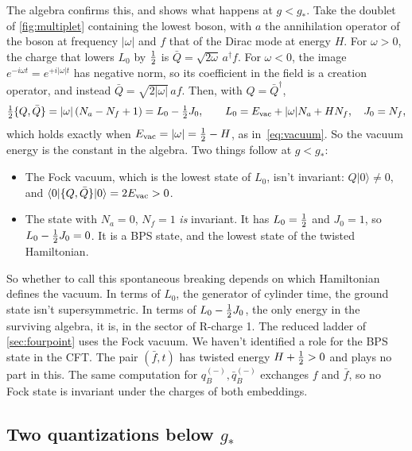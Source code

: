 The algebra confirms this, and shows what happens at $g<g_*$. Take the doublet of \cref{fig:multiplet} containing the lowest boson, with $a$ the annihilation operator of the boson at frequency $|\omega|$ and $f$ that of the Dirac mode at energy $H$. For $\omega>0$, the charge that lowers $L_0$ by $\tfrac12$ is $\bar Q=\sqrt{2\omega}\,a^\dagger f$. For $\omega<0$, the image $e^{-i\omega t}=e^{+i|\omega|t}$ has negative norm, so its coefficient in the field is a creation operator, and instead $\bar Q=\sqrt{2|\omega|}\,af$. Then, with $Q=\bar Q^\dagger$,
\begin{equation}\label{eq:fock}
\tfrac12\{Q,\bar Q\}=|\omega|\,(N_a-N_f+1)=L_0-\tfrac12 J_0,\qquad L_0=E_{\rm vac}+|\omega|N_a+HN_f,\quad J_0=N_f,
\end{equation}
which holds exactly when $E_{\rm vac}=|\omega|=\tfrac12-H$, as in~\eqref{eq:vacuum}. So the vacuum energy is the constant in the algebra. Two things follow at $g<g_*$:
\begin{itemize}
\item The Fock vacuum, which is the lowest state of $L_0$, isn't invariant: $Q|0\rangle\neq0$, and $\langle0|\{Q,\bar Q\}|0\rangle=2E_{\rm vac}>0$.
\item The state with $N_a=0$, $N_f=1$ \emph{is} invariant. It has $L_0=\tfrac12$ and $J_0=1$, so $L_0-\tfrac12 J_0=0$. It is a BPS state, and the lowest state of the twisted Hamiltonian.
\end{itemize}
So whether to call this spontaneous breaking depends on which Hamiltonian defines the vacuum. In terms of $L_0$, the generator of cylinder time, the ground state isn't supersymmetric. In terms of $L_0-\tfrac12 J_0$, the only energy in the surviving algebra, it is, in the sector of R-charge 1. The reduced ladder of \cref{sec:fourpoint} uses the Fock vacuum. We haven't identified a role for the BPS state in the CFT. The pair $(\bar f,t)$ has twisted energy $H+\tfrac12>0$ and plays no part in this. The same computation for $q_B^{(-)},\bar q_B^{(-)}$ exchanges $f$ and $\bar f$, so no Fock state is invariant under the charges of both embeddings.

\subsection{Two quantizations below $g_*$}

